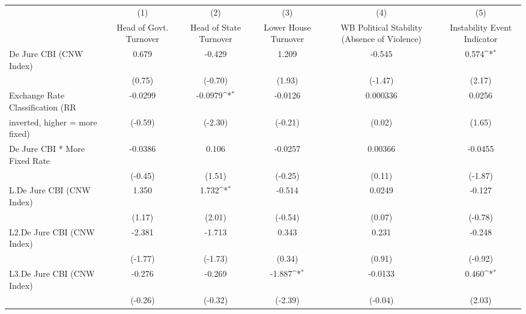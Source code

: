 {
\def\sym#1{\ifmmode^{#1}\else\(^{#1}\)\fi}
\begin{tabular}{l*{5}{c}}
\toprule
                                        &\multicolumn{1}{c}{(1)}&\multicolumn{1}{c}{(2)}&\multicolumn{1}{c}{(3)}&\multicolumn{1}{c}{(4)}&\multicolumn{1}{c}{(5)}\\
                                        &\multicolumn{1}{c}{Head of Govt. Turnover}&\multicolumn{1}{c}{Head of State Turnover}&\multicolumn{1}{c}{Lower House Turnover}&\multicolumn{1}{c}{WB Political Stability (Absence of Violence)}&\multicolumn{1}{c}{Instability Event Indicator}\\
\midrule
De Jure CBI (CNW Index)                 &0.679         &-0.429         &1.209         &-0.545         &0.574\sym{*}  \\
                                        &(0.75)         &(-0.70)         &(1.93)         &(-1.47)         &(2.17)         \\
\addlinespace
Exchange Rate Classification (RR        &-0.0299         &-0.0979\sym{*}  &-0.0126         &0.000336         &0.0256         \\
inverted, higher = more fixed)          &(-0.59)         &(-2.30)         &(-0.21)         &(0.02)         &(1.65)         \\
\addlinespace
De Jure CBI * More Fixed Rate           &-0.0386         &0.106         &-0.0257         &0.00366         &-0.0455         \\
                                        &(-0.45)         &(1.51)         &(-0.25)         &(0.11)         &(-1.87)         \\
\addlinespace
L.De Jure CBI (CNW Index)               &1.350         &1.732\sym{*}  &-0.514         &0.0249         &-0.127         \\
                                        &(1.17)         &(2.01)         &(-0.54)         &(0.07)         &(-0.78)         \\
\addlinespace
L2.De Jure CBI (CNW Index)              &-2.381         &-1.713         &0.343         &0.231         &-0.248         \\
                                        &(-1.77)         &(-1.73)         &(0.34)         &(0.91)         &(-0.92)         \\
\addlinespace
L3.De Jure CBI (CNW Index)              &-0.276         &-0.269         &-1.887\sym{*}  &-0.0133         &0.460\sym{*}  \\
                                        &(-0.26)         &(-0.32)         &(-2.39)         &(-0.04)         &(2.03)         \\

\end{tabular}}
